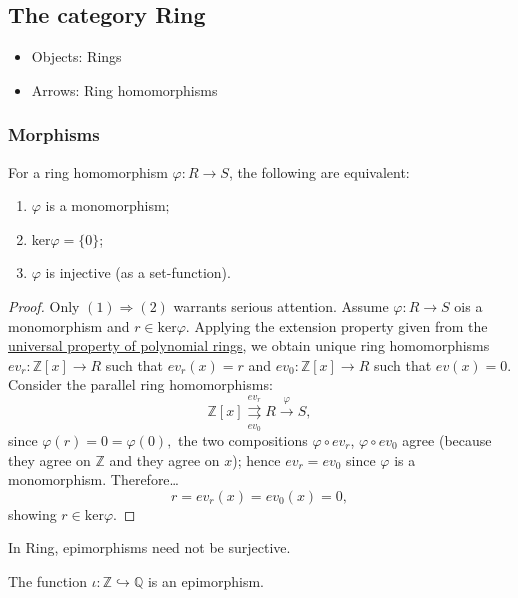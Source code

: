 \subsection{The category Ring}
\begin{itemize}
  \item Objects: Rings
  \item Arrows: Ring homomorphisms
\end{itemize}

\subsubsection{Morphisms}

\begin{proposition}
For a ring homomorphism $\varphi : R \rightarrow S$, the following are equivalent:
\begin{enumerate}
  \item $\varphi$ is a monomorphism;
  \item ker$\varphi = \{0\}$;
  \item $\varphi$ is injective (as a set-function).
\end{enumerate}
\end{proposition}

\begin{proof}
Only $(1) \Rightarrow (2)$ warrants serious attention. Assume $\varphi : R \rightarrow S$ ois a monomorphism and $r \in \textrm{ker}\varphi$.
Applying the extension property given from the \hyperref[universalpropertyofpolynomialrings]{universal property of polynomial rings}, we obtain
unique ring homomorphisms $ev_r : \mathbb{Z}[x] \rightarrow R$ such that $ev_r(x) = r$ and $ev_0 : \mathbb{Z}[x] \rightarrow R$ such that $ev(x) = 0$.
Consider the parallel ring homomorphisms:
$$\mathbb{Z}[x] \underset{ev_0}{\overset{ev_r}{\rightrightarrows}} R \xrightarrow[]{\varphi} S,$$
since $\varphi(r) = 0 = \varphi(0),$ the two compositions $\varphi \circ ev_r$, $\varphi \circ ev_0$ agree (because they agree on $\mathbb{Z}$ and they agree on $x$);
hence $ev_r = ev_0$ since $\varphi$ is a monomorphism. Therefore\dots
$$r = ev_r(x) = ev_0(x) = 0,$$
showing $r \in \textrm{ker}\varphi.$
\end{proof}

\noindent In Ring, epimorphisms need not be surjective.

\begin{proposition}
The function $\iota: \mathbb{Z} \hookrightarrow \mathbb{Q}$ is an epimorphism.
\end{proposition}

